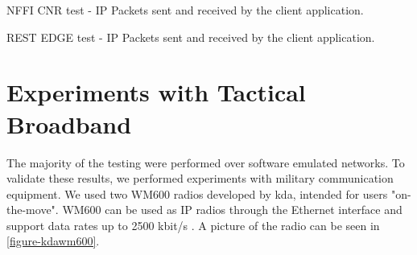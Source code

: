 \begin{landscape}
    \begin{figure}
    \centering
    \begin{floatrow}
    \end{floatrow}
    \end{figure}
\end{landscape}

\begin{table}[h]

\caption{NFFI CNR test - IP Packets sent and received by the client application.}
\label{table:edge-test-packets-nffi}
\end{table}

\begin{table}[h]

\caption{REST EDGE test - IP Packets sent and received by the client application.}
\label{table:edge-test-packets-rest}
\end{table}

\section{Experiments with Tactical Broadband}

The majority of the testing were performed over software emulated networks. To
validate these results, we performed experiments with military communication
equipment. We used two WM600 radios developed by \gls{kda}, intended for users
"on-the-move". WM600 can be used as IP radios through the Ethernet interface and
support data rates up to 2500 kbit/s \cite{kongsberg-wm600}. A picture of the
radio can be seen in \cref{figure-kdawm600}.

